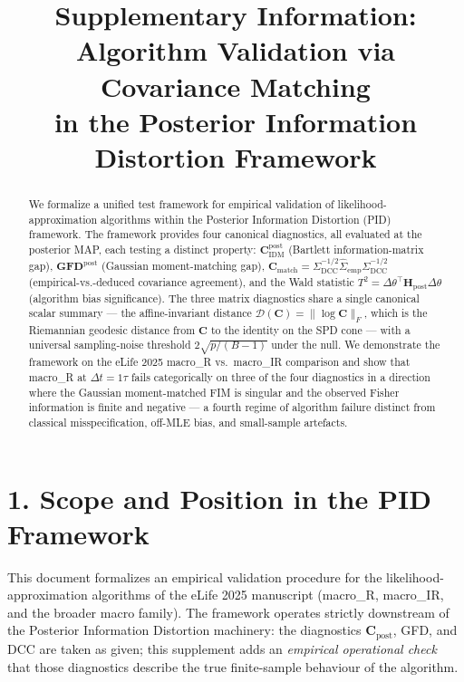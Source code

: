 \documentclass[11pt]{article}
\title{Supplementary Information:\\
Algorithm Validation via Covariance Matching\\
in the Posterior Information Distortion Framework}
\author{}
\date{}
\begin{document}
\maketitle

\begin{abstract}
\noindent We formalize a unified test framework for empirical
validation of likelihood-approximation algorithms within the Posterior
Information Distortion (PID) framework. The framework provides four
canonical diagnostics, all evaluated at the posterior MAP, each
testing a distinct property: $\mathbf C_{\mathrm{IDM}}^{\mathrm{post}}$
(Bartlett information-matrix gap), $\mathbf{GFD}^{\mathrm{post}}$
(Gaussian moment-matching gap),
$\mathbf C_{\mathrm{match}} = \Sigma_{\mathrm{DCC}}^{-1/2}\widehat\Sigma_{\mathrm{emp}}\Sigma_{\mathrm{DCC}}^{-1/2}$
(empirical-vs.-deduced covariance agreement),
and the Wald statistic $T^2 = \Delta\theta^\top\mathbf H_{\mathrm{post}}\Delta\theta$
(algorithm bias significance). The three matrix diagnostics share a
single canonical scalar summary --- the affine-invariant distance
$\mathcal D(\mathbf C) = \|\log \mathbf C\|_F$, which is the
Riemannian geodesic distance from $\mathbf C$ to the identity on the
SPD cone --- with a universal sampling-noise threshold
$2\sqrt{p/(B-1)}$ under the null. We demonstrate the framework on the
eLife 2025 macro\_R vs.\ macro\_IR comparison and show that macro\_R
at $\Delta t = 1\tau$ fails categorically on three of the four
diagnostics in a direction where the Gaussian moment-matched FIM is
singular and the observed Fisher information is finite and negative
--- a fourth regime of algorithm failure distinct from classical
misspecification, off-MLE bias, and small-sample artefacts.
\end{abstract}

\section*{1. Scope and Position in the PID Framework}
\label{sec:av-scope}

This document formalizes an empirical validation procedure for the
likelihood-approximation algorithms of the eLife 2025 manuscript
(macro\_R, macro\_IR, and the broader macro family). The framework
operates strictly downstream of the Posterior Information Distortion
machinery: the diagnostics $\mathbf C_{\mathrm{post}}$, GFD, and DCC
are taken as given; this supplement adds an \emph{empirical
operational check} that those diagnostics describe the true
finite-sample behaviour of the algorithm.
\end{document}
